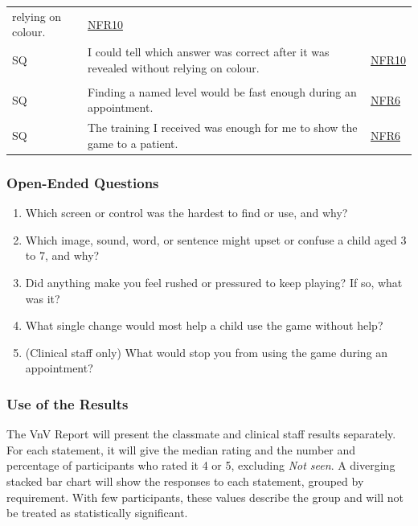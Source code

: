 \documentclass[10pt,titlepage]{article}
\newcounter{surveyq}
\newcommand{\surveyq}{\stepcounter{surveyq}SQ\arabic{surveyq}}
\newcommand{\srsurl}{https://team-hindsight.github.io/ophthamology-game/SRS/SRS.pdf}
\newcommand{\srsnfrref}[2]{\href{\srsurl\#nameddest=#1}{NFR#2}}
\begin{document}
\begin{longtable}{@{}p{}p{}p{}@{}}
  relying on colour. & \srsnfrref{NFR_Colour}{10}\\
\surveyq & I could tell which answer was correct after it was revealed without
  relying on colour. & \srsnfrref{NFR_Colour}{10}\\
\addlinespace[4pt]
\multicolumn{3}{@{}l}{\textit{Clinical staff only}}\\
\surveyq & Finding a named level would be fast enough during an appointment. &
  \srsnfrref{NFR_ClinicianUse}{6}\\
\surveyq & The training I received was enough for me to show the game to a
  patient. & \srsnfrref{NFR_ClinicianUse}{6}\\
\end{longtable}

\subsubsection*{Open-Ended Questions}

\begin{enumerate}[label=OQ\arabic*:, leftmargin=*, itemsep=0.35em]
    \item Which screen or control was the hardest to find or use, and why?

    \item Which image, sound, word, or sentence might upset or confuse a child
    aged 3 to 7, and why?

    \item Did anything make you feel rushed or pressured to keep playing? If so,
    what was it?

    \item What single change would most help a child use the game without help?

    \item (Clinical staff only) What would stop you from using the game during
    an appointment?
\end{enumerate}

\subsubsection*{Use of the Results}

The VnV Report will present the classmate and clinical staff results separately.
For each statement, it will give the median rating and the number and percentage
of participants who rated it 4 or 5, excluding \textit{Not seen}. A diverging
stacked bar chart will show the responses to each statement, grouped by
requirement. With few participants, these values describe the group and will not
be treated as statistically significant.
\end{document}
